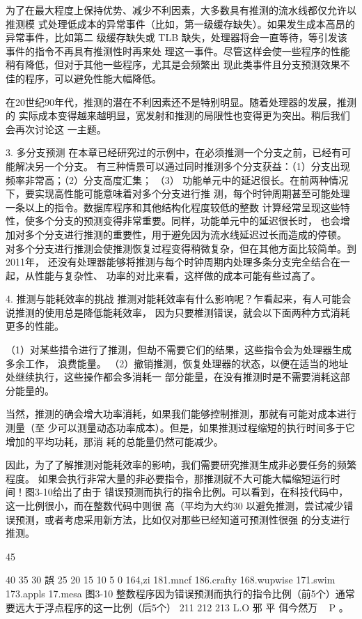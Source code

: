 为了在最大程度上保持优势、减少不利因素，大多数具有推测的流水线都仅允许以推测模
式处理低成本的异常事件（比如，第一级缓存缺失）。如果发生成本高昂的异常事件，比如第二
级缓存缺失或 TLB 缺失，处理器将会一直等待，等引发该事件的指令不再具有推测性时再来处
理这一事件。尽管这样会使一些程序的性能稍有降低，但对于其他一些程序，尤其是会频繁出
现此类事件且分支预测效果不佳的程序，可以避免性能大幅降低。

在20世纪90年代，推测的潜在不利因素还不是特别明显。随着处理器的发展，推测的
实际成本变得越来越明显，宽发射和推测的局限性也变得更为突出。稍后我们会再次讨论这
一主题。

3. 多分支预测
在本章已经研究过的示例中，在必须推测一个分支之前，已经有可能解决另一个分支。
有三种情景可以通过同时推测多个分支获益：（1）分支出现频率非常高；（2）分支高度汇集；
（3） 功能单元中的延迟很长。在前两种情况下，要实现高性能可能意味着对多个分支进行推
测，每个时钟周期甚至可能处理一条以上的指令。数据库程序和其他结构化程度较低的整数
计算经常呈现这些特性，使多个分支的预测变得非常重要。同样，功能单元中的延迟很长时，
也会增加对多个分支进行推测的重要性，用于避免因为流水线延迟过长而造成的停顿。
对多个分支进行推测会使推测恢复过程变得稍微复杂，但在其他方面比较简单。到2011年，
还没有处理器能够将推测与每个时钟周期内处理多条分支完全结合在一起，从性能与复杂性、
功率的对比来看，这样做的成本可能有些过高了。

4. 推测与能耗效率的挑战
推测对能耗效率有什么影响呢？乍看起来，有人可能会说推测的使用总是降低能耗效率，
因为只要椎测错误，就会以下面两种方式消耗更多的性能。

（1）对某些措令进行了推测，但劫不需要它们的结果，这些指令会为处理器生成多余工作，
浪费能量。
（2）撤销推测，恢复处理器的状态，以便在适当的地址处继续执行，这些操作都会多消耗一
部分能量，在没有推测时是不需要消耗这部分能量的。

当然，推测的确会增大功率消耗，如果我们能够控制推测，那就有可能对成本进行测量（至
少可以测量动态功率成本）。但是，如果推测过程缩短的执行时间多于它增加的平均功耗，那消
耗的总能量仍然可能减少。

因此，为了了解推测对能耗效率的影响，我们需要研究推测生成非必要任务的频繁程度。
如果会执行非常大量的非必要指令，那推测就不大可能大幅缩短运行时间！图3-10给出了由于
错误预测而执行的指令比例。可以看到，在科技代码中，这一比例很小，而在整数代码中则很
高（平均为大约30%
以避免推测，尝试减少错误预测，或者考虑采用新方法，比如仅对那些已经知道可预测性很强
的分支进行推测。

45%

40%
35%
30%
誤
25%
20%
15%
10%
5%
0%
164,zi
181.mncf
186.crafty
168.wupwise
171.swim
173.appls
17.mesa
图3-10 整数程序因为错误预测而执行的指令比例（前5个）通常要远大于浮点程序的这一比例（后5个）
211
212
213
L.O
邪 平 佴今然万 ~
P 。

